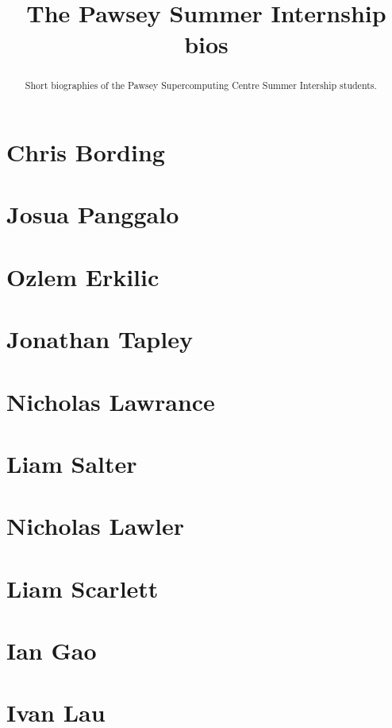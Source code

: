\documentclass[11pt,a4paper]{report}
\title{The Pawsey Summer Internship bios}
\begin{document}
\maketitle
\tableofcontents


\begin{abstract}

Short biographies of the Pawsey Supercomputing Centre Summer Intership students.

\end{abstract}

\chapter{Chris Bording}


\chapter{Josua Panggalo}


\chapter{Ozlem Erkilic}


\chapter{Jonathan Tapley}


\chapter{Nicholas Lawrance}


\chapter{Liam Salter}


\chapter{Nicholas Lawler}


\chapter{Liam Scarlett}


\chapter{Ian Gao}


\chapter{Ivan Lau}

\end{document}
